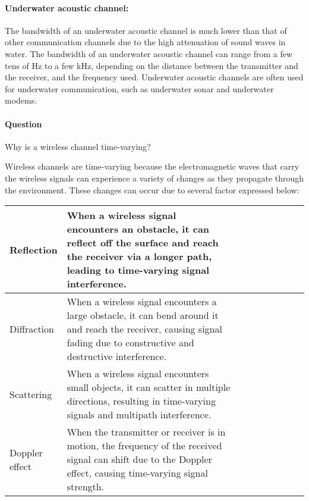 \documentclass[14pt,a4paper]{report}
\newcounter{question}
\newcommand*\question{%
\stepcounter{question}%
\paragraph{Question \thequestion}}
\begin{document}
\begin{answer_box*}
\paragraph{Underwater acoustic channel:}

The bandwidth of an underwater acoustic channel is much lower than that of other communication channels due to the high attenuation of sound waves in water. The bandwidth of an underwater acoustic channel can range from a few tens of Hz to a few kHz, depending on the distance between the transmitter and the receiver, and the frequency used. Underwater acoustic channels are often used for underwater communication, such as underwater sonar and underwater modems.

\end{answer_box*}

\question
{
    Why is a wireless channel time-varying?
}
\begin{answer_box*}

    Wireless channels are time-varying because the electromagnetic waves that carry the wireless signals can experience a variety of changes as they propagate through the environment. These changes can occur due to several factor expressed below: \\

    \begin{tabular}{|l|p{0.7\linewidth}|p{0.3\linewidth}|}
            \hline
            Reflection & When a wireless signal encounters an obstacle, it can reflect off the surface and reach the receiver via a longer path, leading to time-varying signal interference. \\
            \hline
            Diffraction & When a wireless signal encounters a large obstacle, it can bend around it and reach the receiver, causing signal fading due to constructive and destructive interference. \\
            \hline
            Scattering & When a wireless signal encounters small objects, it can scatter in multiple directions, resulting in time-varying signals and multipath interference. \\
            \hline
            Doppler effect & When the transmitter or receiver is in motion, the frequency of the received signal can shift due to the Doppler effect, causing time-varying signal strength. \\
            \hline
    \end{tabular}

\end{answer_box*}
\end{document}
